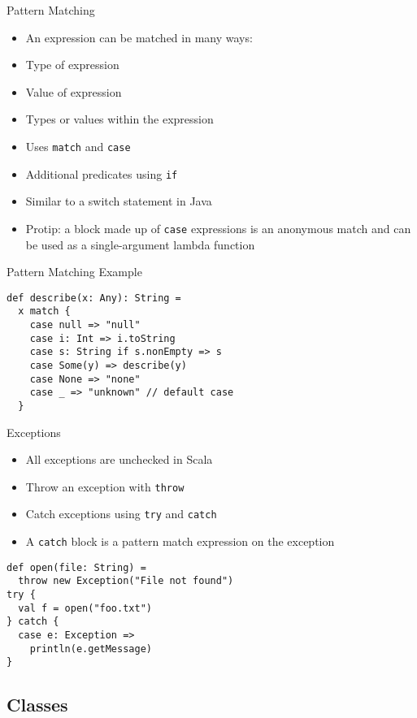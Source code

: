 \documentclass{beamer}
\begin{document}
\begin{frame}{Pattern Matching}
\begin{itemize}
\item An expression can be matched in many ways:
\item Type of expression
\item Value of expression
\item Types or values within the expression
\item Uses \lstinline{match} and \lstinline{case}
\item Additional predicates using \lstinline{if}
\item Similar to a switch statement in Java
\item Protip: a block made up of \lstinline{case} expressions is an anonymous match and can be
used as a single-argument lambda function
\end{itemize}
\end{frame}

\begin{frame}[fragile]{Pattern Matching Example}
\begin{lstlisting}
def describe(x: Any): String =
  x match {
    case null => "null"
    case i: Int => i.toString
    case s: String if s.nonEmpty => s
    case Some(y) => describe(y)
    case None => "none"
    case _ => "unknown" // default case
  }
\end{lstlisting}
\end{frame}

\begin{frame}[fragile]{Exceptions}
\begin{itemize}
\item All exceptions are unchecked in Scala
\item Throw an exception with \lstinline{throw}
\item Catch exceptions using \lstinline{try} and \lstinline{catch}
\item A \lstinline{catch} block is a pattern match expression on the exception
\end{itemize}
\begin{lstlisting}
def open(file: String) =
  throw new Exception("File not found")
try {
  val f = open("foo.txt")
} catch {
  case e: Exception =>
    println(e.getMessage)
}
\end{lstlisting}
\end{frame}


\subsection{Classes}
\end{document}
